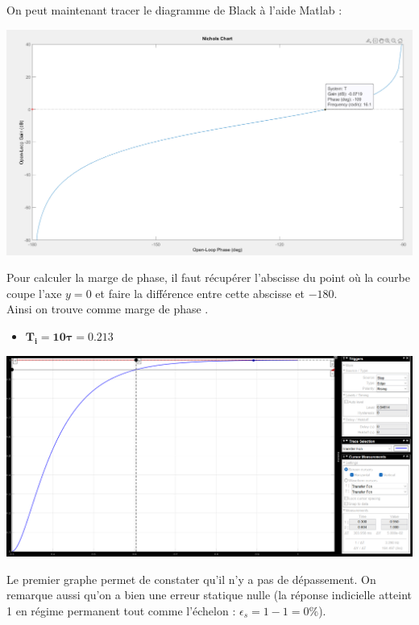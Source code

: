 \documentclass[12pt]{article}
\begin{document}
\normalsize On peut maintenant tracer le diagramme de Black à l'aide Matlab :
\begin{center}
    \includegraphics[width = 16 cm]{TP2 Simulink/Syst_1/Ti=5tau_syst_1_Black.png}
\end{center}
Pour calculer la marge de phase, il faut récupérer l'abscisse du point où la courbe coupe l'axe $y=0$ et faire la différence entre cette abscisse et $-180$.
\\Ainsi on trouve comme marge de phase .
\newpage
\begin{itemize}
    \item \large $\mathbf{T_i = 10\tau = 0.213}$
\end{itemize}
\begin{center}
    
    \includegraphics[width = 16 cm]{TP2 Simulink/Syst_1/tr5prct_syst1_Ti=10tau.png}
    
\end{center}
\normalsize Le premier graphe permet de constater qu'il n'y a pas de dépassement.
On remarque aussi qu'on a bien une erreur statique nulle (la réponse indicielle atteint 1 en régime permanent tout comme l'échelon : $\epsilon_s = 1-1 = 0\%$).
\end{document}
